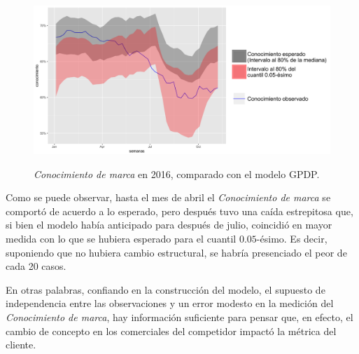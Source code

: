 \begin{figure}[H]
	\centering
	\caption{\textit{Conocimiento de marca} en 2016, comparado con el modelo GPDP.}
	\includegraphics[width=1\textwidth]{Figures/MarketResearch/goals_2016.png}
	\captionsetup{singlelinecheck=off,font=footnotesize}
	\label{awareness_fit}
\end{figure}

Como se puede observar, hasta el mes de abril el \textit{Conocimiento de marca} se comport\'o de acuerdo a lo esperado, pero despu\'es tuvo una ca\'ida estrepitosa que, si bien el modelo hab\'ia anticipado para despu\'es de julio, coincidi\'o en mayor medida con lo que se hubiera esperado para el cuantil $0.05$-\'esimo. Es decir, suponiendo que no hubiera cambio estructural, se habr\'ia presenciado el peor de cada 20 casos.

En otras palabras, confiando en la construcci\'on del modelo, el supuesto de independencia entre las observaciones y un error modesto en la medici\'on del \textit{Conocimiento de marca}, hay informaci\'on suficiente para pensar que, en efecto, el cambio de concepto en los comerciales del competidor impact\'o la m\'etrica del cliente.


\newpage